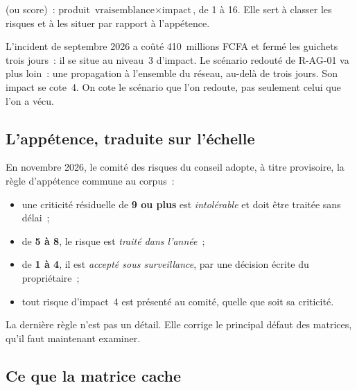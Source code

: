 \begin{boxdef}
 (ou score)~: produit
$\text{vraisemblance} \times \text{impact}$, de 1 à 16. Elle sert à
classer les risques et à les situer par rapport à l'appétence.
\end{boxdef}

L'incident de septembre 2026 a coûté 410~millions FCFA et fermé les
guichets trois jours~: il se situe au niveau~3 d'impact. Le scénario
redouté de R-AG-01 va plus loin~: une propagation à l'ensemble du réseau,
au-delà de trois jours. Son impact se cote~4. On cote le scénario que l'on
redoute, pas seulement celui que l'on a vécu.

\subsection{L'appétence, traduite sur l'échelle}

En novembre 2026, le comité des risques du conseil adopte, à titre
provisoire, la règle d'appétence commune au corpus~:
\begin{itemize}
    \item une criticité résiduelle de \textbf{9 ou plus} est
          \emph{intolérable} et doit être traitée sans délai~;
    \item de \textbf{5 à 8}, le risque est \emph{traité dans l'année}~;
    \item de \textbf{1 à 4}, il est \emph{accepté sous surveillance}, par
          une décision écrite du propriétaire~;
    \item tout risque d'impact~4 est présenté au comité, quelle que soit sa
          criticité.
\end{itemize}

La dernière règle n'est pas un détail. Elle corrige le principal défaut
des matrices, qu'il faut maintenant examiner.

\subsection{Ce que la matrice cache}

